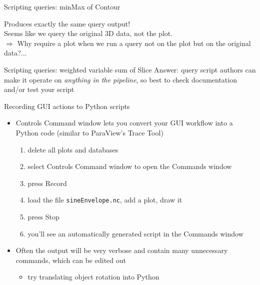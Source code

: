 \begin{frame}{Scripting queries: minMax of Contour}
  
  \pause
  Produces exactly the same query output!\\
  Seems like we query the original 3D data, not the plot.\\
  $\Rightarrow$ Why require a plot when we run a query not on the plot but on the original data?...
\end{frame}

\begin{frame}{Scripting queries: weighted variable sum of Slice}
  Answer: query script authors can make it operate on \emph{anything in the pipeline},
  so best to check documentation and/or test your script
  \bigskip
  
\end{frame}

\begin{frame}{Recording GUI actions to Python scripts}
  \begin{itemize}\setlength{\itemsep}{3mm}
  \item Controls \ra Command window lets you convert your GUI workflow into a Python code (similar to
    ParaView's Trace Tool)
    \begin{enumerate}\setlength{\itemsep}{1mm}
    \item delete all plots and databases
    \item select Controls \ra Command window to open the Commands window
    \item press Record
    \item load the file \texttt{sineEnvelope.nc}, add a plot, draw it
    \item press Stop
    \item you'll see an automatically generated script in the Commands window
    \end{enumerate}
  \item Often the output will be very verbose and contain many unnecessary commands, which can be edited out
    \begin{itemize}\setlength{\itemsep}{1mm}
    \item try translating object rotation into Python
    \end{itemize}
  \end{itemize}
\end{frame}

